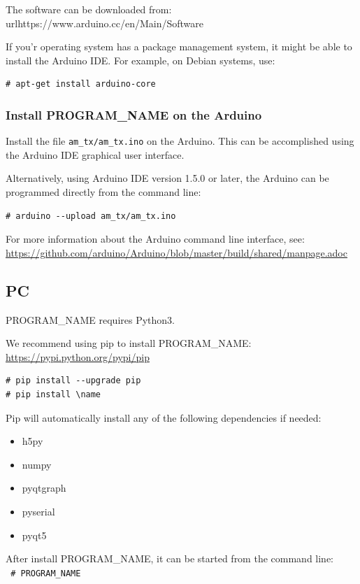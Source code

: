 \documentclass[11pt,letterpaper,article,oneside]{memoir}
\newcommand{\name}{PROGRAM\_NAME}
\begin{document}
The software can be downloaded from:
url{https://www.arduino.cc/en/Main/Software}

If you'r operating system has a package management system, it might be able
to install the Arduino IDE. For example, on Debian systems, use:
\begin{verbatim}
# apt-get install arduino-core
\end{verbatim}

\subsubsection{Install \name{} on the Arduino}
\label{sec:installarduinocode}

Install the file \verb|am_tx/am_tx.ino| on the Arduino.
This can be accomplished using the Arduino IDE graphical user interface.

Alternatively, using Arduino IDE version 1.5.0 or later,
the Arduino can be programmed directly from the command line:

\begin{verbatim}
# arduino --upload am_tx/am_tx.ino
\end{verbatim}

For more information about the Arduino command line interface, see:
\url{https://github.com/arduino/Arduino/blob/master/build/shared/manpage.adoc}

\subsection{PC}
\name{} requires Python3.

We recommend using pip to install \name{}:
\url{https://pypi.python.org/pypi/pip}

\begin{verbatim}
# pip install --upgrade pip
# pip install \name
\end{verbatim}

Pip will automatically install any of the following dependencies if needed:
\begin{itemize}
\item h5py
\item numpy
\item pyqtgraph
\item pyserial
\item pyqt5
\end{itemize}

After install \name{}, it can be started from the command line:\\
\texttt{
\# \name{}
}
\end{document}
